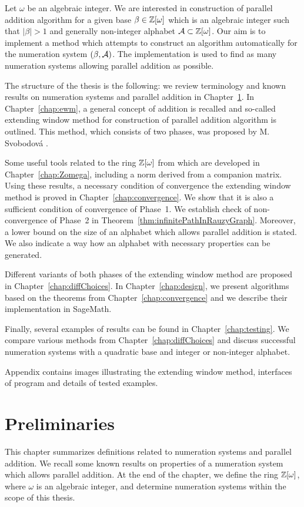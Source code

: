Let $\omega$ be an algebraic integer. We are interested in construction of parallel addition algorithm for a given base $\beta\in\mathbb{Z}[\omega]$ which is an algebraic integer such that $|\beta|>1$ and generally non-integer alphabet $\mathcal{A}\subset\mathbb{Z}[\omega]$. Our aim is to implement a method which attempts to construct an algorithm automatically for the numeration system $(\beta,\mathcal{A})$. The implementation is used to find as many numeration systems allowing parallel addition as possible. 

The structure of the thesis is the following: we review terminology and known results on numeration systems and parallel addition in Chapter~\ref{chap:preliminaries}. In Chapter~\ref{chap:ewm}, a general concept of addition is recalled and so-called extending window method for construction of parallel addition algorithm is outlined. This method, which consists of two phases, was proposed by M. Svobodov\'a \cite{milena}. 

Some useful tools related to the ring $\mathbb{Z}[\omega]$ from which  are developed in Chapter~\ref{chap:Zomega}, including a norm derived from a companion matrix. Using these results, a necessary condition of convergence the extending window method is proved in Chapter~\ref{chap:convergence}. We show that it is also a sufficient condition of convergence of Phase~1. We establish check of non-convergence of Phase~2 in Theorem~\ref{thm:infinitePathInRauzyGraph}. Moreover, a lower bound on the size of an alphabet which allows parallel addition is stated. We also indicate a way how an alphabet with necessary properties can be generated.

Different variants of both phases of the extending window method are proposed in Chapter~\ref{chap:diffChoices}. In Chapter~\ref{chap:design}, we present algorithms based on the theorems from Chapter~\ref{chap:convergence} and we describe their implementation in SageMath.

Finally, several examples of results can be found in Chapter~\ref{chap:testing}. We compare various methods from Chapter~\ref{chap:diffChoices} and discuss successful numeration systems with a quadratic base and integer or non-integer alphabet. 

Appendix contains images illustrating the extending window method, interfaces of program and details of tested examples.

\chapter{Preliminaries}
\label{chap:preliminaries}
This chapter summarizes definitions related to numeration systems and parallel addition. We recall some known results on properties of a numeration system which allows parallel addition. At the end of the chapter, we define the ring $\mathbb{Z}[\omega]$, where $\omega$ is an algebraic integer, and determine numeration systems within the scope of this thesis.
	




